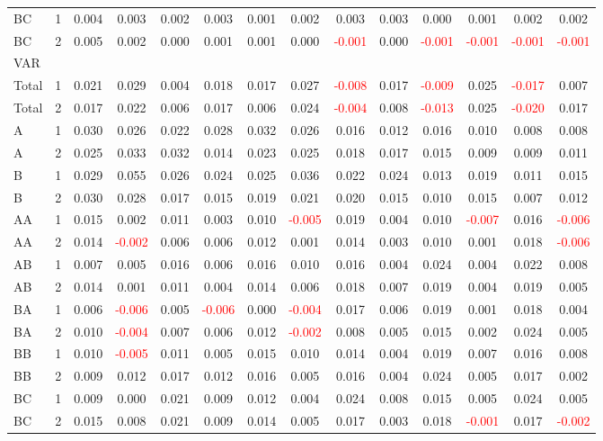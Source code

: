 \begin{table}[H]
{\begin{tabular}{llcccccccccccc}
BC & 1 & 0.004 & 0.003 & 0.002 & 0.003 & 0.001 & 0.002 & 0.003 & 0.003 & 0.000 & 0.001 & 0.002 & 0.002\\
BC & 2 & 0.005 & 0.002 & 0.000 & 0.001 & 0.001 & 0.000 & \textcolor{red}{-0.001} & 0.000 & \textcolor{red}{-0.001} & \textcolor{red}{-0.001} & \textcolor{red}{-0.001} & \textcolor{red}{-0.001}\\
\hline
VAR &  &  &  &  &  &  &  &  &  &  &  &  & \\
\hline
Total & 1 & 0.021 & 0.029 & 0.004 & 0.018 & 0.017 & 0.027 & \textcolor{red}{-0.008} & 0.017 & \textcolor{red}{-0.009} & 0.025 & \textcolor{red}{-0.017} & 0.007\\
Total & 2 & 0.017 & 0.022 & 0.006 & 0.017 & 0.006 & 0.024 & \textcolor{red}{-0.004} & 0.008 & \textcolor{red}{-0.013} & 0.025 & \textcolor{red}{-0.020} & 0.017\\
A & 1 & 0.030 & 0.026 & 0.022 & 0.028 & 0.032 & 0.026 & 0.016 & 0.012 & 0.016 & 0.010 & 0.008 & 0.008\\
A & 2 & 0.025 & 0.033 & 0.032 & 0.014 & 0.023 & 0.025 & 0.018 & 0.017 & 0.015 & 0.009 & 0.009 & 0.011\\
B & 1 & 0.029 & 0.055 & 0.026 & 0.024 & 0.025 & 0.036 & 0.022 & 0.024 & 0.013 & 0.019 & 0.011 & 0.015\\
B & 2 & 0.030 & 0.028 & 0.017 & 0.015 & 0.019 & 0.021 & 0.020 & 0.015 & 0.010 & 0.015 & 0.007 & 0.012\\
AA & 1 & 0.015 & 0.002 & 0.011 & 0.003 & 0.010 & \textcolor{red}{-0.005} & 0.019 & 0.004 & 0.010 & \textcolor{red}{-0.007} & 0.016 & \textcolor{red}{-0.006}\\
AA & 2 & 0.014 & \textcolor{red}{-0.002} & 0.006 & 0.006 & 0.012 & 0.001 & 0.014 & 0.003 & 0.010 & 0.001 & 0.018 & \textcolor{red}{-0.006}\\
AB & 1 & 0.007 & 0.005 & 0.016 & 0.006 & 0.016 & 0.010 & 0.016 & 0.004 & 0.024 & 0.004 & 0.022 & 0.008\\
AB & 2 & 0.014 & 0.001 & 0.011 & 0.004 & 0.014 & 0.006 & 0.018 & 0.007 & 0.019 & 0.004 & 0.019 & 0.005\\
BA & 1 & 0.006 & \textcolor{red}{-0.006} & 0.005 & \textcolor{red}{-0.006} & 0.000 & \textcolor{red}{-0.004} & 0.017 & 0.006 & 0.019 & 0.001 & 0.018 & 0.004\\
BA & 2 & 0.010 & \textcolor{red}{-0.004} & 0.007 & 0.006 & 0.012 & \textcolor{red}{-0.002} & 0.008 & 0.005 & 0.015 & 0.002 & 0.024 & 0.005\\
BB & 1 & 0.010 & \textcolor{red}{-0.005} & 0.011 & 0.005 & 0.015 & 0.010 & 0.014 & 0.004 & 0.019 & 0.007 & 0.016 & 0.008\\
BB & 2 & 0.009 & 0.012 & 0.017 & 0.012 & 0.016 & 0.005 & 0.016 & 0.004 & 0.024 & 0.005 & 0.017 & 0.002\\
BC & 1 & 0.009 & 0.000 & 0.021 & 0.009 & 0.012 & 0.004 & 0.024 & 0.008 & 0.015 & 0.005 & 0.024 & 0.005\\
BC & 2 & 0.015 & 0.008 & 0.021 & 0.009 & 0.014 & 0.005 & 0.017 & 0.003 & 0.018 & \textcolor{red}{-0.001} & 0.017 & \textcolor{red}{-0.002}\\
\hline
    \end{tabular}%
    }
    \label{tab:cen3_sh}
\end{table}


